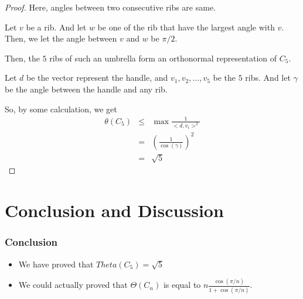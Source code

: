 \documentclass{beamer}
\begin{document}
                  \begin{frame}
                        \begin{proof}
                              Here, angles between two consecutive ribs are same. 
                              
                              Let $v$ be a rib. And let $w$ be one of the rib that have the largest angle with $v$. Then, we let the angle between $v$ and $w$ be $ \pi/2 $.
                  
                              Then, the $5$ ribs of such an umbrella form an orthonormal representation of $C_{5}$.
                  
                              Let $d$ be the vector represent the handle, and $v_{1},v_{2},\dots,v_{5}$ be the $5$ ribs. And let $\gamma$ be the angle between the handle and any rib.
                  
                              So, by some calculation, we get
                              \begin{eqnarray}
                                    \theta(C_{5}) &\le& \max \frac{1}{<d,v_{i}>^{2}} \\
                                    &=& \left(
                                          \frac{1}{\cos(\gamma)}
                                    \right)^{2} \\
                                    &=& \sqrt{5}
                              \end{eqnarray}
                        \end{proof}
                  \end{frame}

      \section{Conclusion and Discussion}

            \begin{frame}
                  \frametitle{Conclusion}
                  \begin{itemize}
                        \item We have proved that $Theta(C_{5}) = \sqrt{5}$
                        \item We could actually proved that $\Theta(C_{n})$ is equal to $ n\frac{\cos(\pi/n)}{1+\cos(\pi/n)} $.
                  \end{itemize}
            \end{frame}
\end{document}
